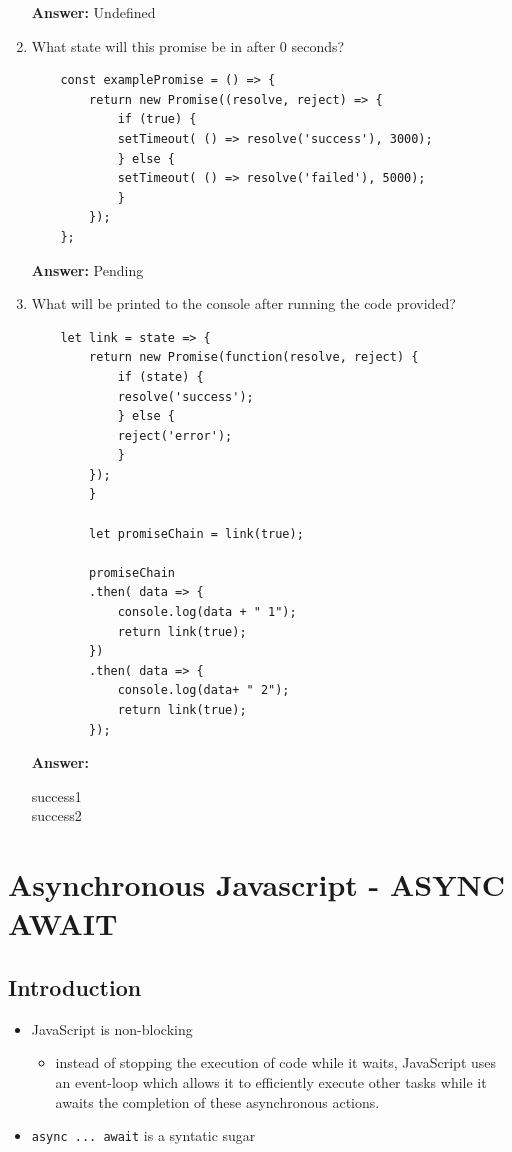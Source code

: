\documentclass[12pt]{article}
\begin{document}
\begin{enumerate}
    \textbf{Answer:} Undefined

    \item What state will this promise be in after 0 seconds?

    \bigskip

    \begin{lstlisting}
    const examplePromise = () => {
        return new Promise((resolve, reject) => {
            if (true) {
            setTimeout( () => resolve('success'), 3000);
            } else {
            setTimeout( () => resolve('failed'), 5000);
            }
        });
    };
    \end{lstlisting}


    \textbf{Answer:} Pending

    \item What will be printed to the console after running the code provided?

    \bigskip

    \begin{lstlisting}
    let link = state => {
        return new Promise(function(resolve, reject) {
            if (state) {
            resolve('success');
            } else {
            reject('error');
            }
        });
        }

        let promiseChain = link(true);

        promiseChain
        .then( data => {
            console.log(data + " 1");
            return link(true);
        })
        .then( data => {
            console.log(data+ " 2");
            return link(true);
        });
    \end{lstlisting}


    \textbf{Answer:}

    success1\\
    success2

\end{enumerate}

\section{Asynchronous Javascript - ASYNC AWAIT}
\subsection{Introduction}
\begin{itemize}
    \item JavaScript is non-blocking
    \begin{itemize}
        \item instead of stopping the execution of code while it waits, JavaScript
        uses an event-loop which allows it to efficiently execute other tasks while
        it awaits the completion of these asynchronous actions.
    \end{itemize}
    \item \texttt{async ... await} is a syntatic sugar
\end{itemize}
\end{document}
